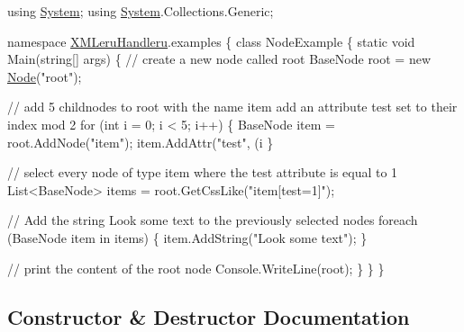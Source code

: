 \begin{DoxyCodeInclude}
\textcolor{keyword}{using} \hyperlink{namespace_system}{System};
\textcolor{keyword}{using} \hyperlink{namespace_system}{System}.Collections.Generic;

\textcolor{keyword}{namespace }\hyperlink{namespace_x_m_leru_handleru}{XMLeruHandleru}.examples
\{
    \textcolor{keyword}{class }NodeExample
    \{
        \textcolor{keyword}{static} \textcolor{keywordtype}{void} Main(\textcolor{keywordtype}{string}[] args)
        \{
            \textcolor{comment}{// create a new node called root}
            BaseNode root = \textcolor{keyword}{new} \hyperlink{class_x_m_leru_handleru_1_1_node_af3e096333b8dcc74789ebc04c0984856}{Node}(\textcolor{stringliteral}{"root"});

            \textcolor{comment}{// add 5 childnodes to root with the name item add an attribute test set to their index mod 2}
            \textcolor{keywordflow}{for} (\textcolor{keywordtype}{int} i = 0; i < 5; i++)
            \{
                BaseNode item = root.AddNode(\textcolor{stringliteral}{"item"});
                item.AddAttr(\textcolor{stringliteral}{"test"}, (i %
            \}

            \textcolor{comment}{// select every node of type item where the test attribute is equal to 1}
            List<BaseNode> items = root.GetCssLike(\textcolor{stringliteral}{"item[test=1]"});

            \textcolor{comment}{// Add the string Look some text to the previously selected nodes }
            \textcolor{keywordflow}{foreach} (BaseNode item \textcolor{keywordflow}{in} items)
            \{
                item.AddString(\textcolor{stringliteral}{"Look some text"});
            \}

            \textcolor{comment}{// print the content of the root node}
            Console.WriteLine(root);
        \}
    \}
\}
\end{DoxyCodeInclude}
 

\subsection{Constructor \& Destructor Documentation}
\hypertarget{class_x_m_leru_handleru_1_1_node_af3e096333b8dcc74789ebc04c0984856}{}
